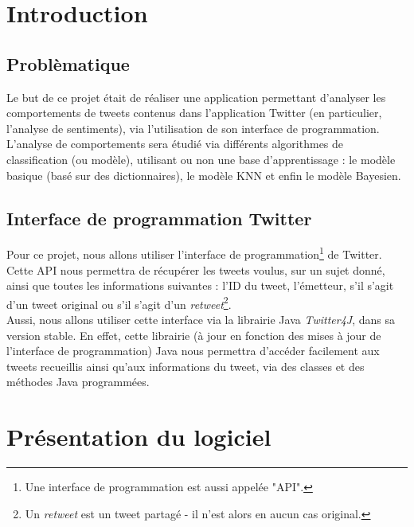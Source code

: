 \documentclass[pdftex,12pt,a4paper]{report}
\begin{document}
\begin{spacing}{1.2}

\tableofcontents

\chapter*{Introduction}


\section{Problèmatique}

Le but de ce projet était de réaliser une application permettant d'analyser les comportements de tweets contenus dans l'application Twitter (en particulier, l'analyse de sentiments), via l'utilisation de son interface de programmation.\\
L'analyse de comportements sera étudié via différents algorithmes de classification (ou modèle), utilisant ou non une base d'apprentissage : le modèle basique (basé sur des dictionnaires), le modèle KNN et enfin le modèle Bayesien.

\section{Interface de programmation Twitter}

Pour ce projet, nous allons utiliser l'interface de programmation\footnote{Une interface de programmation est aussi appelée "API".} de Twitter.\\
Cette API nous permettra de récupérer les tweets voulus, sur un sujet donné, ainsi que toutes les informations suivantes : l'ID du tweet, l'émetteur, s'il s'agit d'un tweet original ou s'il s'agit d'un \textit{retweet}\footnote{Un \textit{retweet} est un tweet partagé - il n'est alors en aucun cas original.}.\\
Aussi, nous allons utiliser cette interface via la librairie Java \textit{Twitter4J}, dans sa version stable. En effet, cette librairie (à jour en fonction des mises à jour de l'interface de programmation) Java nous permettra d'accéder facilement aux tweets recueillis ainsi qu'aux informations du tweet, via des classes et des méthodes Java programmées.

\chapter{Présentation du logiciel}


\end{spacing}
\end{document}
